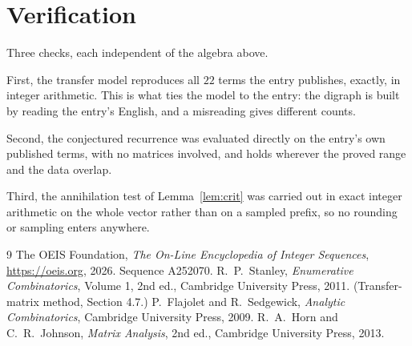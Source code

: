 \documentclass[11pt,a4paper]{article}
\theoremstyle{plain}
\theoremstyle{definition}
\begin{document}
\section{Verification}

Three checks, each independent of the algebra above.

First, the transfer model reproduces all $22$ terms the entry publishes, exactly, in
integer arithmetic. This is what ties the model to the entry: the digraph is built by reading
the entry's English, and a misreading gives different counts.

Second, the conjectured recurrence was evaluated directly on the entry's own published terms,
with no matrices involved, and holds wherever the proved range and the data overlap.

Third, the annihilation test of Lemma~\ref{lem:crit} was carried out in exact integer
arithmetic on the whole vector rather than on a sampled prefix, so no rounding or sampling
enters anywhere.

\begin{thebibliography}{9}
 The OEIS Foundation, \emph{The On-Line Encyclopedia of Integer
Sequences}, \url{https://oeis.org}, 2026. Sequence A252070.
 R.~P.~Stanley, \emph{Enumerative Combinatorics}, Volume 1, 2nd ed.,
Cambridge University Press, 2011. (Transfer-matrix method, Section 4.7.)
 P.~Flajolet and R.~Sedgewick, \emph{Analytic Combinatorics}, Cambridge
University Press, 2009.
 R.~A.~Horn and C.~R.~Johnson, \emph{Matrix Analysis}, 2nd ed., Cambridge
University Press, 2013.
\end{thebibliography}
\end{document}

